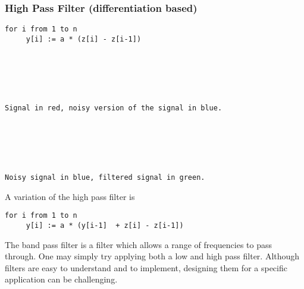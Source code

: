 \hypertarget{high-pass-filter-differentiation-based}{%
\subsubsection{High Pass Filter (differentiation
based)}\label{high-pass-filter-differentiation-based}}

\begin{verbatim}
for i from 1 to n
     y[i] := a * (z[i] - z[i-1])






Signal in red, noisy version of the signal in blue.






Noisy signal in blue, filtered signal in green.
\end{verbatim}

A variation of the high pass filter is

\begin{verbatim}
for i from 1 to n
     y[i] := a * (y[i-1]  + z[i] - z[i-1])
\end{verbatim}

The band pass filter is a filter which allows a range of frequencies to
pass through. One may simply try applying both a low and high pass
filter. Although filters are easy to understand and to implement,
designing them for a specific application can be challenging.
